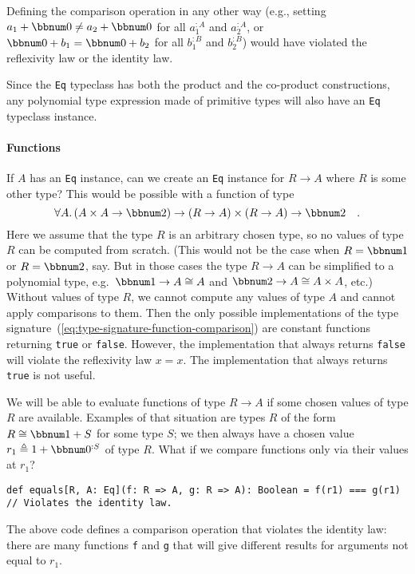 Defining the comparison operation in any other way (e.g., setting
$a_{1}+\bbnum 0\neq a_{2}+\bbnum 0$ for all $a_{1}^{:A}$ and $a_{2}^{:A}$,
or $\bbnum 0+b_{1}=\bbnum 0+b_{2}$ for all $b_{1}^{:B}$ and $b_{2}^{:B}$)
would have violated the reflexivity law or
the identity law.

Since the \lstinline!Eq! typeclass has both the product and the co-product
constructions, any polynomial type expression made of primitive types
will also have an \lstinline!Eq! typeclass instance.

\paragraph{Functions}

If $A$ has an \lstinline!Eq! instance, can we create an \lstinline!Eq!
instance for $R\rightarrow A$ where $R$ is some other type? This
would be possible with a function of type
\begin{equation}
\forall A.\,(A\times A\rightarrow\bbnum 2)\rightarrow\left(R\rightarrow A\right)\times\left(R\rightarrow A\right)\rightarrow\bbnum 2\quad.\label{eq:type-signature-function-comparison}
\end{equation}
Here we assume that the type $R$ is an arbitrary chosen type, so
no values of type $R$ can be computed from scratch. (This would not
be the case when $R=\bbnum 1$ or $R=\bbnum 2$, say. But in those
cases the type $R\rightarrow A$ can be simplified to a polynomial
type, e.g.~$\bbnum 1\rightarrow A\cong A$ and $\bbnum 2\rightarrow A\cong A\times A$,
etc.) Without values of type $R$, we cannot compute any values of
type $A$ and cannot apply comparisons to them. Then the only possible
implementations of the type signature~(\ref{eq:type-signature-function-comparison})
are constant functions returning \lstinline!true! or \lstinline!false!.
However, the implementation that always returns \lstinline!false!
will violate the reflexivity law $x=x$. The implementation that always
returns \lstinline!true! is not useful.

We will be able to evaluate functions of type $R\rightarrow A$ if
some chosen values of type $R$ are available. Examples of that situation
are types $R$ of the form $R\cong\bbnum 1+S$ for some type $S$;
we then always have a chosen value $r_{1}\triangleq1+\bbnum 0^{:S}$
of type $R$. What if we compare functions only via their values at
$r_{1}$?
\begin{lstlisting}
def equals[R, A: Eq](f: R => A, g: R => A): Boolean = f(r1) === g(r1)  // Violates the identity law.
\end{lstlisting}
The above code defines a comparison operation that violates the identity
law: there are many functions \lstinline!f! and \lstinline!g! that
will give different results for arguments not equal to $r_{1}$. 

